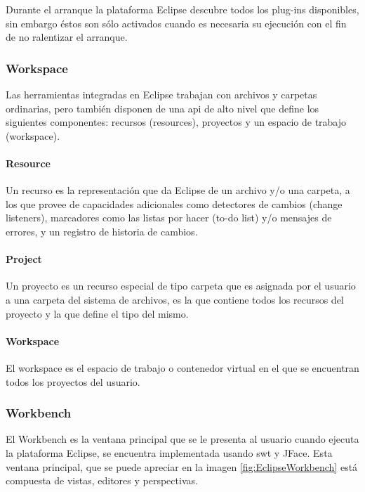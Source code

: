 \documentclass[a4paper,12pt,oneside,spanish]{book}
\begin{document}
Durante el arranque la plataforma Eclipse descubre todos los plug-ins disponibles, sin embargo éstos son sólo activados cuando es necesaria su ejecución con el fin de no ralentizar el arranque.


\subsubsection{Workspace}

Las herramientas integradas en Eclipse trabajan con archivos y carpetas ordinarias, pero también disponen de una \gls{api} de alto nivel que define los siguientes componentes: recursos (resources), proyectos y un espacio de trabajo (workspace).

\paragraph{Resource} Un recurso es la representación que da Eclipse de un archivo y/o una carpeta, a los que provee de capacidades adicionales como detectores de cambios (change listeners), marcadores como las listas por hacer (to-do list) y/o mensajes de errores, y un registro de historia de cambios.

\paragraph{Project} Un proyecto es un recurso especial de tipo carpeta que es asignada por el usuario a una carpeta del sistema de archivos, es la que contiene todos los recursos del proyecto y la que define el tipo del mismo.

\paragraph{Workspace} El workspace es el espacio de trabajo o contenedor virtual en el que se encuentran todos los proyectos del usuario.


\subsubsection{Workbench}

El Workbench es la ventana principal que se le presenta al usuario cuando ejecuta la plataforma Eclipse, se encuentra implementada usando \gls{swt} y JFace. Esta ventana principal, que se puede apreciar en la imagen \ref{fig:EclipseWorkbench} está compuesta de vistas, editores y perspectivas.
\end{document}
